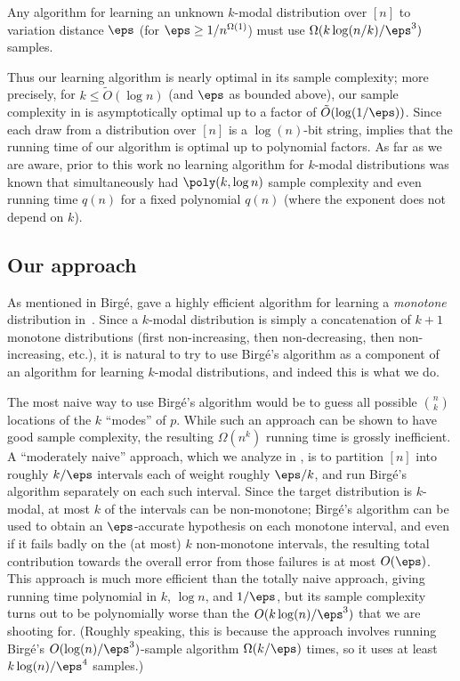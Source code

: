 %

\begin{proposition} \label{obs:lowerbound}
Any algorithm for learning an unknown $k$-modal distribution over $[n]$ to variation distance
$\eps$ (for $\eps \geq 1/n^{\Omega(1)}$) must use $\Omega(k \log(n/k)/\eps^3)$ samples.
\end{proposition}

%

Thus our learning algorithm is nearly optimal in its sample complexity; more precisely,
for $k \leq \tilde{O}( {\log n})$ (and $\eps$ as bounded above), our sample complexity in  is asymptotically optimal up to a factor of $\tilde{O}(\log(1/\eps))$.  Since each draw
from a distribution over $[n]$ is a $\log(n)$-bit string, 
implies that the running time of our algorithm is optimal up to polynomial factors.  
 {As far as we are aware,} prior to this work no learning
algorithm for $k$-modal distributions was known that simultaneously had
$\poly(k,\log n)$ sample complexity  {and even running time $q(n)$ for a 
fixed polynomial $q(n)$ (where the exponent does not depend on
$k$).
}


\subsection{Our approach}

As mentioned in  Birg\'{e}, gave a highly efficient algorithm for learning a
\emph{monotone} distribution in~\cite{Birge:87b}.  Since a $k$-modal distribution is simply
a concatenation of $k+1$ monotone distributions (first non-increasing, then non-decreasing, then
non-increasing, etc.),
it is natural to try to use Birg\'{e}'s
algorithm as a component of an algorithm for learning $k$-modal distributions, and indeed this is what we do.

The most naive way to use Birg\'{e}'s algorithm would be to guess all possible $\binom{n}{k}$ locations of the $k$ ``modes'' of $p$.  While such an approach can be shown to have good sample complexity, the resulting $\Omega(n^k)$ running time is grossly inefficient.  A ``moderately naive'' approach, which we analyze in , is to partition $[n]$ into roughly $k/\eps$ intervals each of weight roughly $\eps/k$, and run Birg\'{e}'s algorithm separately on each such interval.  Since the target distribution is $k$-modal, at most $k$ of the intervals can be non-monotone; Birg\'{e}'s algorithm can be used to obtain an $\eps$-accurate hypothesis on each monotone interval, and even if it fails badly on the (at most) $k$ non-monotone intervals, the resulting total contribution towards the overall error from those failures is at most $O(\eps)$.  This approach is much more efficient than the totally naive approach, giving
running time polynomial in $k$, $\log n$, and $1/\eps$, but its sample complexity turns out to be polynomially worse
than the $O(k\log(n)/\eps^3)$ that we are shooting for.  (Roughly speaking, this is because the approach involves running Birg\'{e}'s $O(\log(n)/\eps^3)$-sample algorithm 
$ {\Omega}(k/\eps)$ times, so it uses at least $k\log(n)/\eps^4$ samples.)

